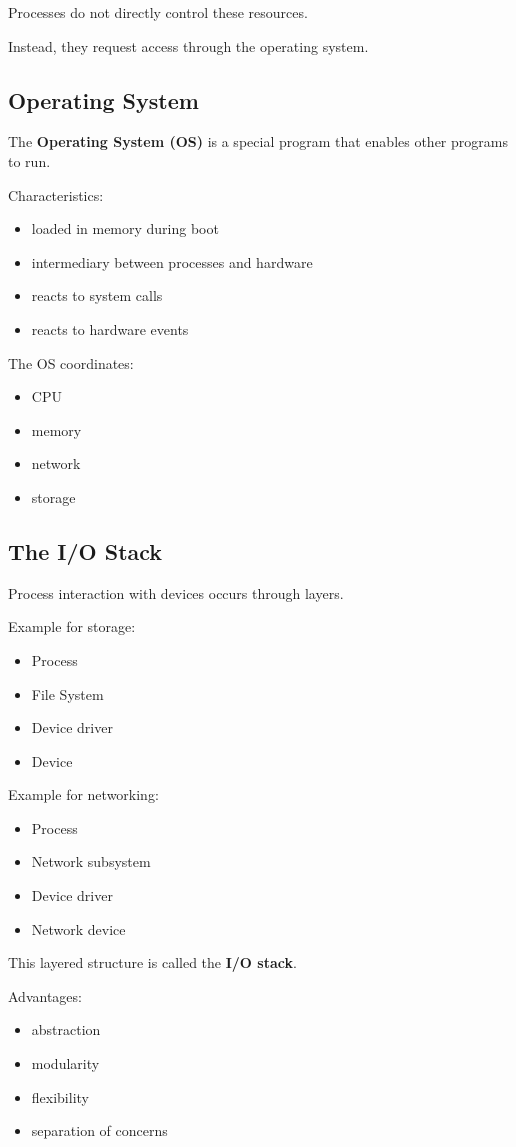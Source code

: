 Processes do not directly control these resources.

Instead, they request access through the operating system.

\subsection{Operating System}

The \textbf{Operating System (OS)} is a special program that enables other programs to run.

Characteristics:

\begin{itemize}
\item loaded in memory during boot
\item intermediary between processes and hardware
\item reacts to system calls
\item reacts to hardware events
\end{itemize}

The OS coordinates:

\begin{itemize}
\item CPU
\item memory
\item network
\item storage
\end{itemize}

\subsection{The I/O Stack}

Process interaction with devices occurs through layers.

Example for storage:

\begin{itemize}
\item Process
\item File System
\item Device driver
\item Device
\end{itemize}

Example for networking:

\begin{itemize}
\item Process
\item Network subsystem
\item Device driver
\item Network device
\end{itemize}

This layered structure is called the \textbf{I/O stack}.

Advantages:

\begin{itemize}
\item abstraction
\item modularity
\item flexibility
\item separation of concerns
\end{itemize}

